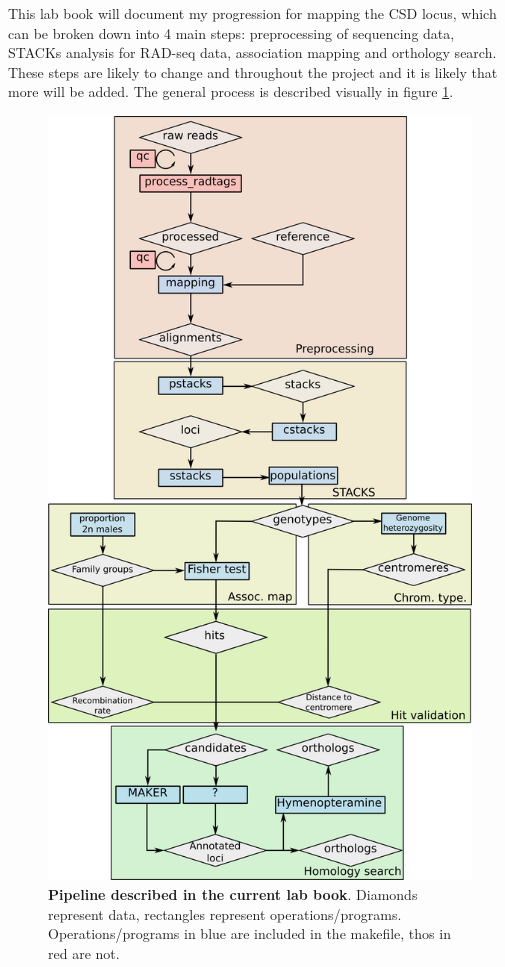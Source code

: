 \documentclass[10pt,a4paper]{report}
\begin{document}
This lab book will document my progression for mapping the CSD locus, which can be broken down into 4 main steps: preprocessing of sequencing data, STACKs analysis for RAD-seq data, association mapping and orthology search. These steps are likely to change and throughout the project and it is likely that more will be added. The general process is described visually in figure \ref{pipeline}.
\begin{figure}
\includegraphics[scale=0.5]{flowchart}
\caption{\textbf{Pipeline described in the current lab book}. Diamonds represent data, rectangles represent operations/programs. Operations/programs in blue are included in the makefile, thos in red are not.}
\label{pipeline}
\end{figure}
\end{document}
